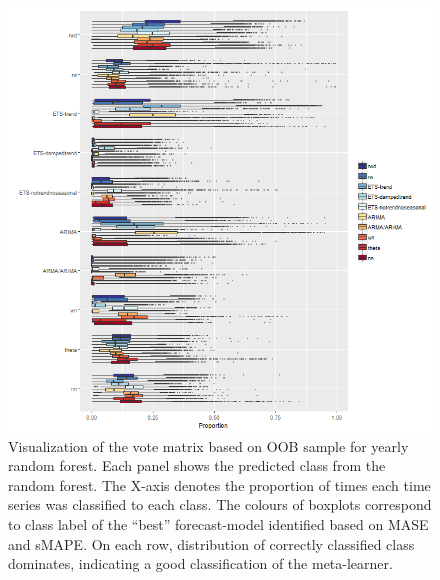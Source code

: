 \documentclass[11pt,a4paper,]{article}
\begin{document}
\begin{figure}
\centering
\includegraphics{figures/yearlyoob-1.png}
\caption{\label{fig:yearlyoob}Visualization of the vote matrix based on OOB sample for yearly random forest. Each panel shows the predicted class from the random forest. The X-axis denotes the proportion of times each time series was classified to each class. The colours of boxplots correspond to class label of the ``best'' forecast-model identified based on MASE and sMAPE. On each row, distribution of correctly classified class dominates, indicating a good classification of the meta-learner.}
\end{figure}
\end{document}
